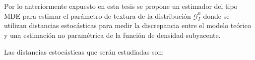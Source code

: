 Por lo anteriormente expuesto en esta tesis se propone un estimador del tipo MDE para estimar el parámetro de textura de la distribución $\mathcal{G}_I^{0}$ donde se utilizan distancias estocásticas para medir la discrepancia entre el modelo teórico y  una estimación no paramétrica de la función de densidad subyacente. 


%
%
%

Las distancias estocásticas que serán estudiadas son:

